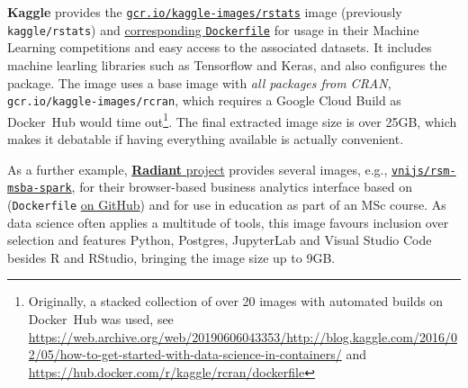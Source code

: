 \textbf{Kaggle} provides the
\href{https://hub.docker.com/r/kaggle/rstats}{\texttt{gcr.io/kaggle-images/rstats}}
image (previously \texttt{kaggle/rstats}) and
\href{https://github.com/Kaggle/docker-rstats}{corresponding
\texttt{Dockerfile}} for usage in their Machine Learning competitions
and easy access to the associated datasets. It includes machine learling
libraries such as Tensorflow and Keras, and also configures the
 package. The image uses a base image with \emph{all
packages from CRAN}, \texttt{gcr.io/kaggle-images/rcran}, which requires
a Google Cloud Build as Docker~Hub would time
out\footnote{Originally, a stacked collection of over 20 images with automated builds on Docker~Hub was used, see \href{https://web.archive.org/web/20190606043353/http://blog.kaggle.com/2016/02/05/how-to-get-started-with-data-science-in-containers/}{https://web.archive.org/web/20190606043353/http://blog.kaggle.com/2016/02/05/how-to-get-started-with-data-science-in-containers/} and \href{https://hub.docker.com/r/kaggle/rcran/dockerfile}{https://hub.docker.com/r/kaggle/rcran/dockerfile}}.
The final extracted image size is over 25GB, which makes it debatable if
having everything available is actually convenient.

As a further example,
\href{https://radiant-rstats.github.io/docs/}{\textbf{Radiant} project}
provides several images, e.g.,
\href{https://hub.docker.com/r/vnijs/rsm-msba-spark}{\texttt{vnijs/rsm-msba-spark}},
for their browser-based business analytics interface based on
 (\texttt{Dockerfile}
\href{https://github.com/radiant-rstats/docker}{on GitHub}) and for use
in education as part of an MSc course. As data science often applies a
multitude of tools, this image favours inclusion over selection and
features Python, Postgres, JupyterLab and Visual Studio Code besides R
and RStudio, bringing the image size up to 9GB.

